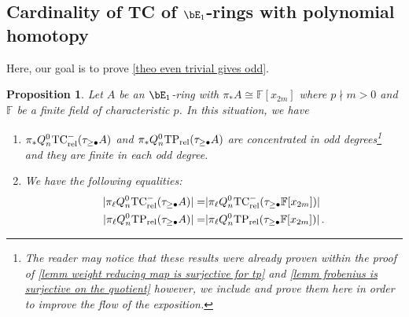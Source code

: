 \documentclass[english,10pt]{amsart}
\newcommand{\rel}{\textup{rel}}
\newcommand{\field}{\mathbb{F}}
\newtheorem{prop}{Proposition}[section]
\theoremstyle{definition}
\numberwithin{equation}{section}
\newcommand{\rntc}{\mathrm{TC}_{\rel}^{-}}
\newcommand{\rtp}{\mathrm{TP}_{\rel}}
\begin{document}
\subsection{Cardinality of TC of \texorpdfstring{$\bE_1$-rings}{ring spectra} with polynomial homotopy}

Here, our goal is to prove \autoref{theo even trivial gives odd}.

\begin{prop}\label{prop cardinalities of quotients of ntc and ntp}
Let  $A$ be an  $\bE_1$-ring with $\pi_*A \cong \field[x_{2m}]$ where $p\nmid m>0$ and $\field$ be a finite field of characteristic $p$. In this situation, we have 
\begin{enumerate}
\item $\pi_* Q_n^0 \rntc(\tau_{\geq \bullet}A)$ and $\pi_* Q_n^0 \rtp(\tau_{\geq \bullet}A)$ are concentrated in odd degrees\footnote{The reader may notice that these results were already proven within the proof of \autoref{lemm weight reducing map is surjective for tp} and \autoref{lemm frobenius is surjective on the quotient} however, we include and prove them here in order to improve the flow of the exposition.} and they are finite in each odd degree. 
\item We have the following equalities:
\begin{equation*}
\begin{split}
\lvert \pi_\ell Q_n^0 \rntc(\tau_{\geq \bullet}A)\rvert =& \lvert \pi_\ell Q_n^0 \rntc(\tau_{\geq \bullet} \field[x_{2m}]) \rvert\\
\lvert \pi_\ell Q_n^0 \rtp(\tau_{\geq \bullet}A)\rvert =& \lvert \pi_\ell Q_n^0 \rtp(\tau_{\geq \bullet} \field[x_{2m}]) \rvert \,.
\end{split}
\end{equation*}

\end{enumerate}
\end{prop}
\end{document}
